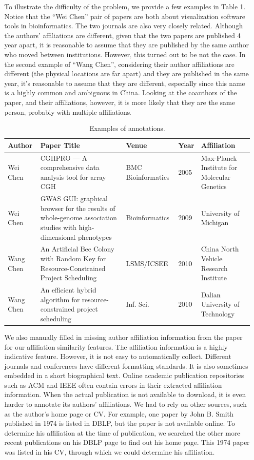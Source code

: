 \documentclass[twocolumn,letterpaper]{article}
\begin{document}
To illustrate the difficulty of the problem, we provide a few examples in Table \ref{tbl:examples}.  Notice that the ``Wei Chen'' pair of papers are both about visualization software tools in bioinformatics.  The two journals are also very closely related.  Although the authors' affiliations are different, given that the two papers are published 4 year apart, it is reasonable to assume that they are published by the same author who moved between institutions.  However, this turned out to be not the case.  In the second example of ``Wang Chen'', considering their author affiliations are different (the physical locations are far apart) and they are published in the same year, it's reasonable to assume that they are different, especially since this name is a highly common and ambiguous in China.  Looking at the coauthors of the paper, and their affiliations, however, it is more likely that they are the same person, probably with multiple affiliations.
\begin{table}
  \centering
  \begin{tabular}{l|p{4cm}|l|l|p{4cm}}
    Author & Paper Title  & Venue & Year & Affiliation \\ \hline
    Wei Chen & CGHPRO --- A comprehensive data analysis tool for array CGH & BMC Bioinformatics & 2005 & Max-Planck Institute for Molecular Genetics \\
    Wei Chen & GWAS GUI: graphical browser for the results of whole-genome association studies with high-dimensional phenotypes & Bioinformatics & 2009 & University of Michigan \\ \hline
    Wang Chen & An Artificial Bee Colony with Random Key for Resource-Constrained Project Scheduling & LSMS/ICSEE & 2010 & China North Vehicle Research Institute \\
    Wang Chen & An efficient hybrid algorithm for resource-constrained project scheduling & Inf. Sci. & 2010 & Dalian University of Technology
  \end{tabular}
  \caption{Examples of annotations.}
  \label{tbl:examples}
\end{table}

We also manually filled in missing author affiliation information from the paper for our affiliation similarity features.  The affiliation information is a highly indicative feature.  However, it is not easy to automatically collect.  Different journals and conferences have different formatting standards.  It is also sometimes embedded in a short biographical text.  Online academic publication repositories such as ACM and IEEE often contain errors in their extracted affiliation information.  When the actual publication is not available to download, it is even harder to annotate its authors' affiliations.  We had to rely on other sources, such as the author's home page or CV.  For example, one paper by John B. Smith published in 1974 is listed in DBLP, but the paper is not available online.  To determine his affiliation at the time of publication, we searched the other more recent publications on his DBLP page to find out his home page.  This 1974 paper was listed in his CV, through which we could determine his affiliation.
\end{document}
